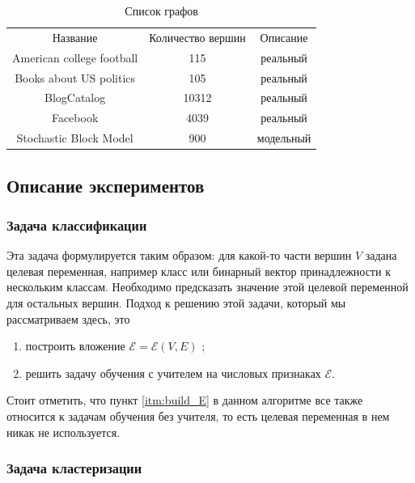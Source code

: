 \documentclass[12pt,a4paper]{extarticle}
\newcommand{\E}{\mathcal{E}}
\begin{document}
    \begin{table}
    \begin{center}
    \begin{tabular}{ccc}
    	Название & Количество вершин & Описание\\
        \noalign{\smallskip}
        \hline
        \noalign{\smallskip}
        American college football & 115 & реальный \\
        Books about US politics & 105 & реальный \\
        BlogCatalog & 10312 & реальный \\
        Facebook & 4039 & реальный \\
        Stochastic Block Model & 900 & модельный
    \end{tabular}
    \end{center}
    \caption{Список графов} \label{table_graphs}
    \end{table}
    
    \subsection{Описание экспериментов}
    
    \subsubsection{Задача классификации}
    
    Эта задача формулируется таким образом: для какой-то части вершин $V$ задана целевая переменная, например класс или бинарный вектор принадлежности к нескольким классам. Необходимо предсказать значение этой целевой переменной для остальных вершин.
    Подход к решению этой задачи, который мы рассматриваем здесь, это 
    \begin{enumerate}
        \item построить вложение $\E = \E(V, E)$ \label{itm:build_E};
        \item решить задачу обучения с учителем на числовых признаках $\E$.
    \end{enumerate}
    
    Стоит отметить, что пункт \ref{itm:build_E} в данном алгоритме все также относится к задачам обучения без учителя, то есть целевая переменная в нем никак не используется.
    
    \subsubsection{Задача кластеризации}
    
\end{document}
